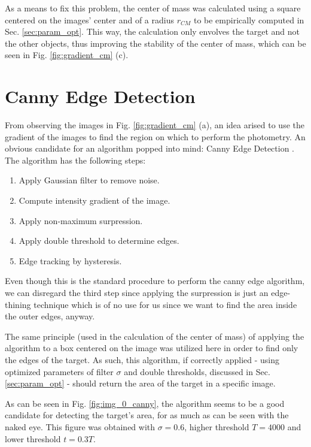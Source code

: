 \documentclass{aa}
\begin{document}
As a means to fix this problem, the center of mass was calculated using a square centered on the images' center and of a radius $r_{CM}$ to be empirically computed in Sec. \ref{sec:param_opt}. This way, the calculation only envolves the target and not the other objects, thus improving the stability of the center of mass, which can be seen in Fig. \ref{fig:gradient_cm} (c).

\section{Canny Edge Detection}

From observing the images in Fig. \ref{fig:gradient_cm} (a), an idea arised to use the gradient of the images to find the region on which to perform the photometry. An obvious candidate for an algorithm popped into mind: Canny Edge Detection \cite{canny}. The algorithm has the following steps:

\begin{enumerate}
\item Apply Gaussian filter to remove noise.
\item Compute intensity gradient of the image.
\item Apply non-maximum surpression.
\item Apply double threshold to determine edges.
\item Edge tracking by hysteresis.
\end{enumerate}

Even though this is the standard procedure to perform the canny edge algorithm, we can disregard the third step since applying the surpression is just an edge-thining technique which is of no use for us since we want to find the area inside the outer edges, anyway.

The same principle (used in the calculation of the center of mass) of applying the algorithm to a box centered on the image was utilized here in order to find only the edges of the target. As such, this algorithm, if correctly applied - using optimized parameters of filter $\sigma$ and double thresholds, discussed in Sec. \ref{sec:param_opt} - should return the area of the target in a specific image.

As can be seen in Fig. \ref{fig:img_0_canny}, the algorithm seems to be a good candidate for detecting the target's area, for as much as can be seen with the naked eye. This figure was obtained with $\sigma = 0.6$, higher threshold $T = 4000$ and lower threshold $t = 0.3T$.
\end{document}
